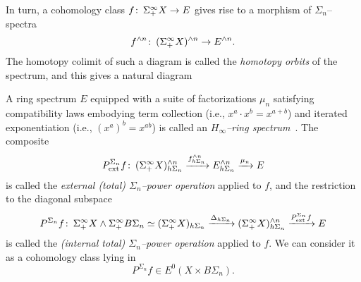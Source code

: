\noindent In turn, a cohomology class \(f\colon\thinspace \Sigma^\infty_+ X \to E\) gives rise to a morphism of \(\Sigma_n\)--spectra \[f^{\wedge n}\colon\thinspace (\Sigma^\infty_+ X)^{\wedge n} \to E^{\wedge n}.\]  The homotopy colimit of such a diagram is called the \textit{homotopy orbits} of the spectrum, and this gives a natural diagram
\begin{center}
\end{center}
A ring spectrum \(E\) equipped with a suite of factorizations \(\mu_n\) satisfying compatibility laws embodying term collection (i.e., \(x^a \cdot x^b = x^{a+b}\)) and iterated exponentiation (i.e., \((x^a)^b = x^{ab}\)) is called an \textit{\(H_\infty\)--ring spectrum}~\cite[Definition I.3.1]{BMMS}.  The composite \[P^{\Sigma_n}_{\mathrm{ext}}f\colon\thinspace (\Sigma^\infty_+ X)^{\wedge n}_{h\Sigma_n} \xrightarrow{f^{\wedge n}_{h\Sigma_n}} E^{\wedge n}_{h\Sigma_n} \xrightarrow{\mu_n} E\] is called the \textit{external (total) \(\Sigma_n\)--power operation} applied to \(f\), and the restriction to the diagonal subspace \[P^{\Sigma_n}f \colon\thinspace \Sigma^\infty_+ X \wedge \Sigma^\infty_+ B\Sigma_n \simeq (\Sigma^\infty_+ X)_{h\Sigma_n} \xrightarrow{\Delta_{h\Sigma_n}} (\Sigma^\infty_+ X)^{\wedge n}_{h\Sigma_n} \xrightarrow{P^{\Sigma_n}_{\mathrm{ext}}f} E\] is called the \textit{(internal total) \(\Sigma_n\)--power operation} applied to \(f\).  We can consider it as a cohomology class lying in \[P^{\Sigma_n} f \in E^0(X \times B\Sigma_n).\]


